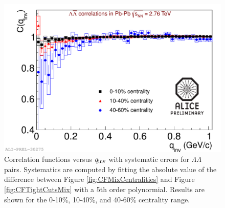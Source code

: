 \begin{figure}[hbtp]
\includegraphics[scale=0.7]{2012-Jul-25-LamALamPrelim.pdf}
\caption[Correlation functions versus $q_{\rm inv}$ for $\Lambda\bar{\Lambda}$ pairs in three centrality ranges with systematic errors.]{Correlation functions versus $q_{\rm inv}$ with systematic errors for $\Lambda\bar{\Lambda}$ pairs. Systematics are computed by fitting the absolute value of the difference between Figure \ref{fig:CFMixCentralities} and Figure \ref{fig:CFTightCutsMix} with a 5th order polynormial. Results are shown for the 0-10\%, 10-40\%, and 40-60\% centrality range.}
\label{fig:CFMixSystematics}
\end{figure}








%